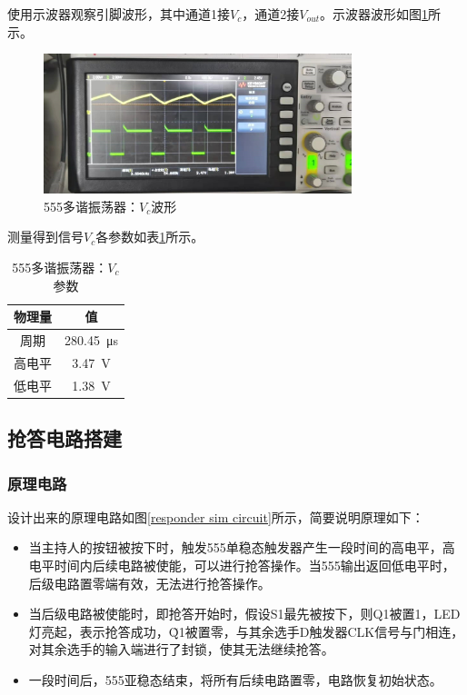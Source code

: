 \documentclass[UTF8]{ctexart}
\numberwithin{figure}{subsection}
\numberwithin{table}{subsection}
\numberwithin{equation}{subsection}
\begin{document}
\par 使用示波器观察引脚波形，其中通道1接\(V_c\)，通道2接\(V_{out}\)。示波器波形如图\ref{multiosci vc osci}所示。

\begin{figure}[H]
    \begin{center}
        \includegraphics[width=0.8\textwidth]{555/multiosci/vc.jpg}
    \end{center}
    \caption{555多谐振荡器：\(V_c\)波形}
    \label{multiosci vc osci}
\end{figure}

测量得到信号\(V_c\)各参数如表\ref{multiosci vc table}所示。

\begin{table}
    \begin{center}
        \begin{tabular}{c | c}
            物理量 & 值 \\
            \hline
            周期 & \SI{280.45}{\micro\second} \\
            高电平 & \SI{3.47}{\volt} \\
            低电平 & \SI{1.38}{\volt} \\
        \end{tabular}
        \label{multiosci vc table}
        \caption{555多谐振荡器：\(V_c\)参数}
    \end{center}
\end{table}

\subsection{抢答电路搭建}

\subsubsection{原理电路}
设计出来的原理电路如图\ref{responder sim circuit}所示，简要说明原理如下：
\begin{itemize}
    \item 当主持人的按钮被按下时，触发555单稳态触发器产生一段时间的高电平，高电平时间内后续电路被使能，可以进行抢答操作。当555输出返回低电平时，后级电路置零端有效，无法进行抢答操作。
    \item 当后级电路被使能时，即抢答开始时，假设S1最先被按下，则Q1被置1，LED灯亮起，表示抢答成功，\~Q1被置零，与其余选手D触发器CLK信号与门相连，对其余选手的输入端进行了封锁，使其无法继续抢答。
    \item 一段时间后，555亚稳态结束，将所有后续电路置零，电路恢复初始状态。
\end{itemize}
\end{document}
